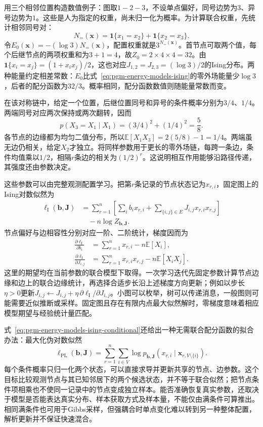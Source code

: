 用三个相邻位置构造数值例子：图取$1-2-3$，不设单点偏好，同号边势为$3$、异号边势为$1$。这些是人为指定的权重，尚未归一化为概率。为计算联合权重，先统计相邻同号对：
\[
  N_{=}(\bm{x})
   =\mathbf{1}\{x_1=x_2\}+\mathbf{1}\{x_2=x_3\}.
\]
令$E_0(\bm{x})=-(\log3)N_{=}(\bm{x})$，配置权重就是$3^{N_{=}(\bm{x})}$。首节点可取两个值，每个后继节点的两项权重和为$3+1=4$，故$Z_0=2\times4\times4=32$。由$\mathbf{1}\{x_i=x_j\}=(1+x_ix_j)/2$，这也对应$J_{1,2}=J_{2,3}=(\log3)/2$的Ising分布。两种能量约定相差常数：$E_0$比式~\eqref{eq:pgm-energy-models-ising}的零外场能量少$\log3$，后者的配分函数为$32/3$。概率相同，配分函数数值则随能量常数而变。

在该对称链中，给定一个位置，后继位置同号和异号的条件概率分别为$3/4$、$1/4$。两端同号对应两次保持或两次翻转，因而
\[
  p(X_3=X_1\mid X_1)
    =(3/4)^2+(1/4)^2=\frac58.
\]
各节点的边缘都为均匀二值分布，所以$\mathbb{E}[X_1X_3]=2(5/8)-1=1/4$。两端虽无边仍相关，给定$X_2$才独立。将同样参数用于更长的零外场链，每跨一条边，条件均值乘以$1/2$，相隔$r$条边的相关为$(1/2)^r$。这说明相互作用能够沿路径传递，其强度还由参数决定。

这些参数可以由完整观测配置学习。把第$r$条记录的节点状态记为$x_{r,i}$，固定图上的Ising对数似然为
\begin{equation}
  \begin{aligned}
  \ell_{\mathrm{I}}(\bm{b},\bm{J})
   &=\sum_{r=1}^n\left[
        \sum_i b_i x_{r,i}
        +\sum_{\{i,j\}\in E}J_{i,j}x_{r,i}x_{r,j}\right]\\
   &\quad-n\log Z_{\bm{b},\bm{J}}.
  \end{aligned}
  \label{eq:pgm-energy-models-ising-likelihood}
\end{equation}
节点偏好与边相容性分别对应一阶、二阶统计，梯度因而为
\[
  \begin{aligned}
    \frac{\partial\ell_{\mathrm{I}}}{\partial b_i}
      &=\sum_{r=1}^n x_{r,i}-n\mathbb{E}[X_i],\\
    \frac{\partial\ell_{\mathrm{I}}}{\partial J_{i,j}}
      &=\sum_{r=1}^n x_{r,i}x_{r,j}-n\mathbb{E}[X_iX_j].
  \end{aligned}
\]
这里的期望均在当前参数的联合模型下取得。一次学习迭代先固定参数计算节点边缘和边上的联合边缘统计，再选择合适步长沿上述梯度方向更新；例如以步长$\eta>0$更新$J_{i,j}\leftarrow J_{i,j}+\eta\,\partial\ell_{\mathrm{I}}/\partial J_{i,j}$。小图可以枚举，树可以传递消息，一般图则可能需要近似推断或采样。固定图且存在有限内点最大似然解时，零梯度意味着相应模型期望与经验统计量匹配。

式~\eqref{eq:pgm-energy-models-ising-conditional}还给出一种无需联合配分函数的拟合办法：最大化伪对数似然
\[
  \ell_{\mathrm{PL}}(\bm{b},\bm{J})
    =\sum_{r=1}^n\sum_{i\in V}
       \log p_{\bm{b},\bm{J}}
           (x_{r,i}\mid\bm{x}_{r,V\setminus\{i\}}).
\]
每个条件概率只归一化两个状态，可以直接求导并更新共享的节点、边参数。这个目标比较观测节点与其已知邻居下的两个候选状态，并不等于联合似然；把节点条件项相乘也不使同一记录中的节点变成独立样本。能否准确恢复真实参数，还取决于模型是否能表达真实分布、样本获取方式及样本量，不能仅由满条件可算推出。相同满条件也可用于Gibbs采样，但强耦合时单点变化难以转到另一种整体配置，解析更新并不保证快速混合。

